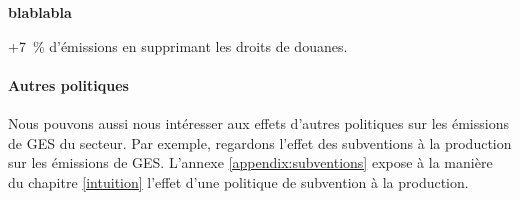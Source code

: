 \textbf{blablabla}

+7~\% d'émissions en supprimant les droits de douanes.

\paragraph{Autres politiques}\label{Sec_subvention}
Nous pouvons aussi nous intéresser aux effets d'autres politiques sur les émissions de GES du secteur. Par exemple, regardons l'effet des subventions à la production sur les émissions de GES. L'annexe \ref{appendix:subventions} expose à la manière du chapitre \ref{intuition} l'effet d'une politique de subvention à la production.